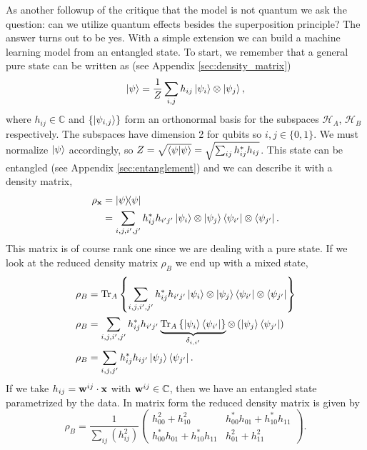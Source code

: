 As another followup of the critique that the model is not quantum we ask the question: can we utilize quantum effects besides the superposition principle? The answer turns out to be yes. With a simple extension we can build a machine learning model from an entangled state. To start, we remember that a general pure state can be written as (see Appendix \ref{sec:density_matrix})
\begin{equation*}
    \ket{\psi} = \frac{1}{Z}\sum_{i,j} h_{ij} \ket{\psi_i}\otimes\ket{\psi_j},
\end{equation*}
where $h_{ij}\in \mathbb{C}$ and $\{\ket{\psi_{i,j}}\}$ form an orthonormal basis for the subspaces $\mathcal{H}_A$, $\mathcal{H}_B$ respectively. The subspaces have dimension 2 for qubits so $i,j \in \{0,1\}$. We must normalize $\ket{\psi}$ accordingly, so $Z= \sqrt{\braket{\psi}{\psi}}=\sqrt{ \sum_{ij} h_{ij}^*h_{ij}}$. This state can be entangled (see Appendix \ref{sec:entanglement}) and we can describe it with a density matrix,
\begin{align*}
    \rho_\mathbf{x} &= \ketbra{\psi}{\psi}\\
    &= \sum_{i,j,i^\prime, j^\prime} h_{ij}^*h_{i^\prime j^\prime} \ket{\psi_i} \otimes \ket{\psi_j}\bra{\psi_{i^\prime}}\otimes\bra{\psi_{j^\prime}}.
\end{align*}
This matrix is of course rank one since we are dealing with a pure state. If we look at the reduced density matrix $\rho_B$ we end up with a mixed state,
\begin{align*}
    \rho_B &= \Tr_A\left\{\sum_{i,j,i^\prime, j^\prime} h_{ij}^*h_{i^\prime j^\prime} \ket{\psi_i} \otimes \ket{\psi_j}\bra{\psi_{i^\prime}}\otimes\bra{\psi_{j^\prime}}\right\}\\
    \rho_B &= \sum_{i,j,i^\prime, j^\prime} h_{ij}^*h_{i^\prime j^\prime}\underbrace{\Tr_A\left\{ \ket{\psi_i}\bra{\psi_{i^\prime}}\right\}}_{\delta_{i, i^\prime}} \otimes \left(\ket{\psi_j}\bra{\psi_{j^\prime}}\right)\\
    \rho_B &= \sum_{i,j, j^\prime} h_{ij}^*h_{i j^\prime}\ket{\psi_j}\bra{\psi_{j^\prime}}.
\end{align*}
If we take $h_{ij} = \mathbf{w}^{ij}\cdot\mathbf{x}$ with $\mathbf{w}^{ij} \in \mathbb{C}$, then we have an entangled state parametrized by the data. In matrix form the reduced density matrix is given by
\begin{equation*}
    \rho_B = \frac{1}{\sum_{ij} (h_{ij}^2)}\begin{pmatrix}
    h_{00}^2 + h_{10}^2 & h_{00}^*h_{01} + h_{10}^*h_{11}\\
    h_{00}^*h_{01} + h_{10}^*h_{11} &  h_{01}^2 + h_{11}^2
    \end{pmatrix}.
\end{equation*}
